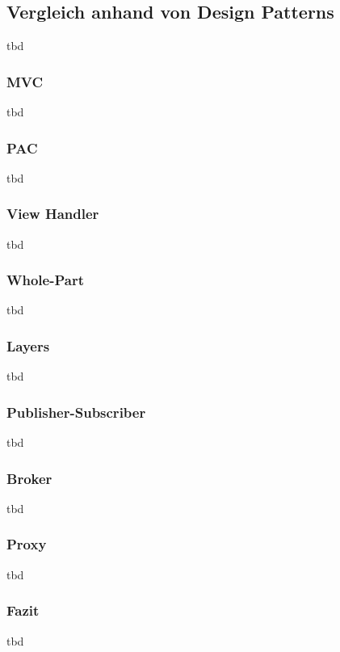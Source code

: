 \color{red}

\subsection{Vergleich anhand von Design Patterns}
tbd

\subsubsection{MVC}
tbd

\subsubsection{PAC}
tbd

\subsubsection{View Handler}
tbd

\subsubsection{Whole-Part}
tbd

\subsubsection{Layers}
tbd

\subsubsection{Publisher-Subscriber}
tbd

\subsubsection{Broker}
tbd

\subsubsection{Proxy}
tbd

\subsubsection{Fazit}
tbd

\color{black}

